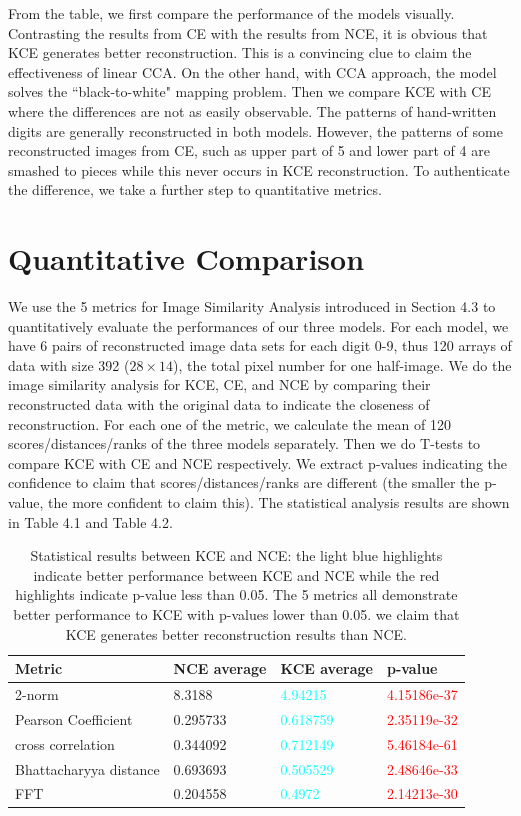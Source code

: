 \documentclass[12pt]{report} %
\begin{document}
From the table, we first compare the performance of the models visually. Contrasting the results from CE with the results from NCE, it is obvious that KCE generates better reconstruction. This is a convincing clue to claim the effectiveness of linear CCA. On the other hand, with CCA approach, the model solves the ``black-to-white" mapping problem. Then we compare KCE with CE where the differences are not as easily observable. The patterns of hand-written digits are generally reconstructed in both models. However, the patterns of some reconstructed images from CE, such as upper part of 5 and lower part of 4 are smashed to pieces while this never occurs in KCE reconstruction. To authenticate the difference, we take a further step to quantitative metrics. 

\section{Quantitative Comparison}
We use the 5 metrics for Image Similarity Analysis introduced in Section 4.3 to quantitatively evaluate the performances of our three models. For each model, we have 6 pairs of reconstructed image data sets for each digit 0-9, thus 120 arrays of data with size 392 ($28 \times 14$), the total pixel number for one half-image. We do the image similarity analysis for KCE, CE, and NCE by comparing their reconstructed data with the original data to indicate the closeness of reconstruction. For each one of the metric, we calculate the mean of 120 scores/distances/ranks of the three models separately. Then we do T-tests\cite{TTEST} to compare KCE with CE and NCE respectively. We extract p-values indicating the confidence to claim that scores/distances/ranks are different (the smaller the p-value, the more confident to claim this). The statistical analysis results are shown in Table 4.1 and Table 4.2.

\begin{table}[H]
	\centering
	\begin{tabular}{m{5cm}m{3cm}m{3cm}m{3cm}}
		\toprule
		Metric & NCE average & KCE average & p-value \\
		\midrule
		2-norm & 8.3188 & \textcolor{cyan}{4.94215} & \textcolor{red}{4.15186e-37} \\
		Pearson Coefficient & 0.295733 & \textcolor{cyan}{0.618759} & \textcolor{red}{2.35119e-32} \\
		cross correlation & 0.344092 & \textcolor{cyan}{0.712149} & \textcolor{red}{5.46184e-61} \\
		Bhattacharyya distance & 0.693693 & \textcolor{cyan}{0.505529} & \textcolor{red}{2.48646e-33} \\
		FFT & 0.204558 & \textcolor{cyan}{0.4972} & \textcolor{red}{2.14213e-30} \\
		\bottomrule
	\end{tabular}
	\caption{Statistical results between KCE and NCE: the light blue highlights indicate better performance between KCE and NCE while the red highlights indicate p-value less than 0.05. The 5 metrics all demonstrate better performance to KCE with p-values lower than 0.05. we claim that KCE generates better reconstruction results than NCE.}
\end{table}
\end{document}
